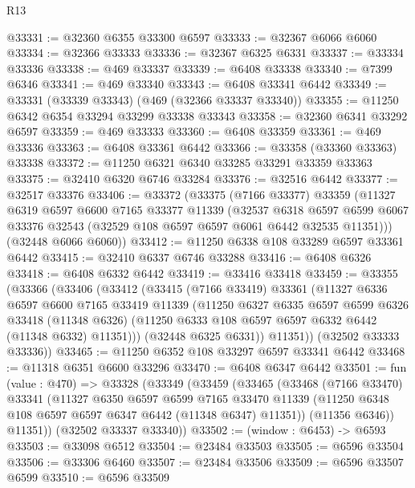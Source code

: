 \begin{lexlean}{R13}
\begin{coremodule}
@33331 := @32360 @6355 @33300 @6597
@33333 := @32367 @6066 @6060
@33334 := @32366 @33333
@33336 := @32367 @6325 @6331
@33337 := @33334 @33336
@33338 := @469 @33337
@33339 := @6408 @33338
@33340 := @7399 @6346
@33341 := @469 @33340
@33343 := @6408 @33341 @6442
@33349 := @33331 (@33339 @33343) (@469 (@32366 @33337 @33340))
@33355 := @11250 @6342 @6354 @33294 @33299 @33338 @33343
@33358 := @32360 @6341 @33292 @6597
@33359 := @469 @33333
@33360 := @6408 @33359
@33361 := @469 @33336
@33363 := @6408 @33361 @6442
@33366 := @33358 (@33360 @33363) @33338
@33372 := @11250 @6321 @6340 @33285 @33291 @33359 @33363
@33375 := @32410 @6320 @6746 @33284
@33376 := @32516 @6442
@33377 := @32517 @33376
@33406 := @33372
    (@33375
      (@7166 @33377)
      @33359
      (@11327
        @6319
        @6597
        @6600
        @7165
        @33377
        @11339
        (@32537
          @6318
          @6597
          @6599
          @6067
          @33376
          @32543
          (@32529 @108 @6597 @6597 @6061 @6442 @32535 @11351)))
      (@32448 @6066 @6060))
@33412 := @11250 @6338 @108 @33289 @6597 @33361 @6442
@33415 := @32410 @6337 @6746 @33288
@33416 := @6408 @6326
@33418 := @6408 @6332 @6442
@33419 := @33416 @33418
@33459 := @33355
    (@33366
      (@33406
        (@33412
          (@33415
            (@7166 @33419)
            @33361
            (@11327
              @6336
              @6597
              @6600
              @7165
              @33419
              @11339
              (@11250
                @6327
                @6335
                @6597
                @6599
                @6326
                @33418
                (@11348 @6326)
                (@11250 @6333 @108 @6597 @6597 @6332 @6442 (@11348 @6332) @11351)))
            (@32448 @6325 @6331))
          @11351))
      (@32502 @33333 @33336))
@33465 := @11250 @6352 @108 @33297 @6597 @33341 @6442
@33468 := @11318 @6351 @6600 @33296
@33470 := @6408 @6347 @6442
@33501 := fun (value : @470) =>
  @33328
    (@33349
      (@33459
        (@33465
          (@33468
            (@7166 @33470)
            @33341
            (@11327
              @6350
              @6597
              @6599
              @7165
              @33470
              @11339
              (@11250 @6348 @108 @6597 @6597 @6347 @6442 (@11348 @6347) @11351))
            (@11356 @6346))
          @11351))
      (@32502 @33337 @33340))
@33502 := (window : @6453) -> @6593
@33503 := @33098 @6512
@33504 := @23484 @33503
@33505 := @6596 @33504
@33506 := @33306 @6460
@33507 := @23484 @33506
@33509 := @6596 @33507 @6599
@33510 := @6596 @33509

\end{coremodule}
\end{lexlean}
